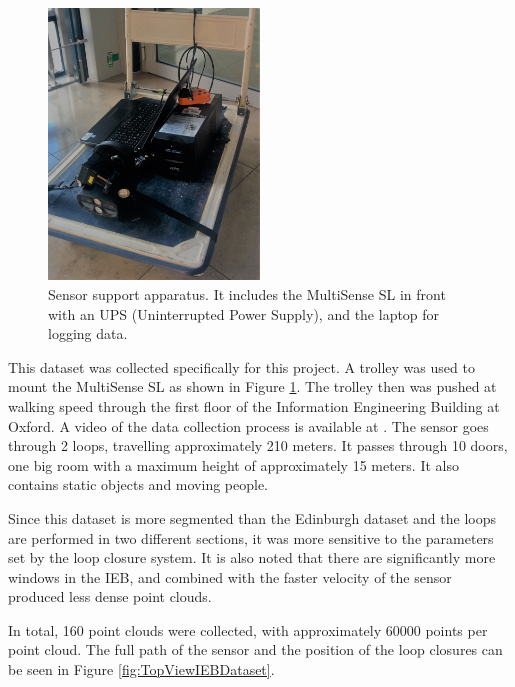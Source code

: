 \documentclass[11pt]{article}
\begin{document}
	\begin{figure}
		\centering
		\includegraphics[width=0.5\textwidth]{MountLiDAR}
		\caption[t]{Sensor support apparatus. It includes the MultiSense SL in front with an UPS (Uninterrupted Power Supply), and the laptop for logging data.}
		\label{fig:Mount}
	\end{figure}

This dataset was collected specifically for this project. A trolley was used to mount the MultiSense SL as shown in Figure \ref{fig:Mount}. The trolley then was pushed at walking speed through the first floor of the Information Engineering Building at Oxford. A video of the data collection process is available at \cite{me}. The sensor goes through 2 loops, travelling approximately 210 meters. It passes through 10 doors, one big room with a maximum height of approximately 15 meters. It also contains static objects and moving people.

	
Since this dataset is more segmented than the Edinburgh dataset and the loops are performed in two different sections, it was more sensitive to the parameters set by the loop closure system. It is also noted that there are significantly more windows in the IEB, and combined with the faster velocity of the sensor produced less dense point clouds. 
	
In total, 160 point clouds were collected, with approximately 60000 points per point cloud. The full path of the sensor and the position of the loop closures can be seen in Figure \ref{fig:TopViewIEBDataset}.
\end{document}
